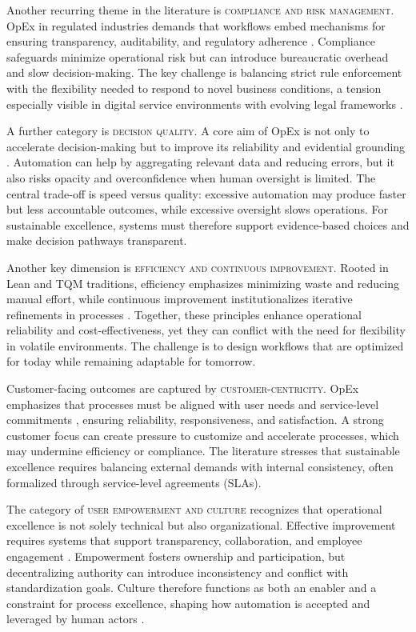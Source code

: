 Another recurring theme in the literature is \textsc{compliance and risk management}. OpEx in regulated industries demands that workflows embed mechanisms for ensuring transparency, auditability, and regulatory adherence \parencite{owoadeSystematic2024}. Compliance safeguards minimize operational risk but can introduce bureaucratic overhead and slow decision-making. The key challenge is balancing strict rule enforcement with the flexibility needed to respond to novel business conditions, a tension especially visible in digital service environments with evolving legal frameworks \parencite{juranQuality1999}.

A further category is \textsc{decision quality}. A core aim of OpEx is not only to accelerate decision-making but to improve its reliability and evidential grounding \parencite{owoadeSystematic2024}. Automation can help by aggregating relevant data and reducing errors, but it also risks opacity and overconfidence when human oversight is limited. The central trade-off is speed versus quality: excessive automation may produce faster but less accountable outcomes, while excessive oversight slows operations. For sustainable excellence, systems must therefore support evidence-based choices and make decision pathways transparent.

Another key dimension is \textsc{efficiency and continuous improvement}. Rooted in Lean and TQM traditions, efficiency emphasizes minimizing waste and reducing manual effort, while continuous improvement institutionalizes iterative refinements in processes \parencite{juranQuality1999,womackLean2013}. Together, these principles enhance operational reliability and cost-effectiveness, yet they can conflict with the need for flexibility in volatile environments. The challenge is to design workflows that are optimized for today while remaining adaptable for tomorrow.

Customer-facing outcomes are captured by \textsc{customer-centricity}. OpEx emphasizes that processes must be aligned with user needs and service-level commitments \parencite{womackLean2013,juranQuality1999}, ensuring reliability, responsiveness, and satisfaction. A strong customer focus can create pressure to customize and accelerate processes, which may undermine efficiency or compliance. The literature stresses that sustainable excellence requires balancing external demands with internal consistency, often formalized through service-level agreements (SLAs).

The category of \textsc{user empowerment and culture} recognizes that operational excellence is not solely technical but also organizational. Effective improvement requires systems that support transparency, collaboration, and employee engagement \parencite{womackLean2013}. Empowerment fosters ownership and participation, but decentralizing authority can introduce inconsistency and conflict with standardization goals. Culture therefore functions as both an enabler and a constraint for process excellence, shaping how automation is accepted and leveraged by human actors \parencite{juranQuality1999}.

